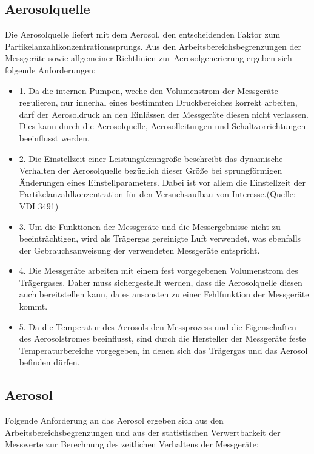 \subsection{Aerosolquelle}
Die Aerosolquelle liefert mit dem Aerosol, den entscheidenden Faktor zum Partikelanzahlkonzentrationssprungs. Aus den Arbeitsbereichsbegrenzungen der Messger\"{a}te sowie allgemeiner Richtlinien zur Aerosolgenerierung ergeben sich folgende Anforderungen:

\begin{itemize}
\item 1. Da die internen Pumpen, weche den Volumenstrom der Messger\"{a}te regulieren, nur innerhal eines bestimmten Druckbereiches korrekt arbeiten, darf der Aerosoldruck an den Einl\"{a}ssen der Messger\"{a}te diesen nicht verlassen. Dies kann durch die Aerosolquelle, Aerosolleitungen und Schaltvorrichtungen beeinflusst werden. 

\item 2. Die Einstellzeit einer Leistungskenngr\"{o}{\ss}e beschreibt das dynamische Verhalten der Aerosolquelle bez\"{u}glich dieser Gr\"{o}{\ss}e bei sprungf\"{o}rmigen \"{A}nderungen eines Einstellparameters. Dabei ist vor allem die Einstellzeit der Partikelanzahlkonzentration für den Versuchsaufbau von Interesse.(Quelle: VDI 3491)

\item 3. Um die Funktionen der Messger\"{a}te und die Messergebnisse nicht zu beeintr\"{a}chtigen, wird als Tr\"{a}gergas gereinigte Luft verwendet, was ebenfalls der Gebrauchsanweisung der verwendeten Messger\"{a}te entspricht. 

\item 4. Die Messger\"{a}te arbeiten mit einem fest vorgegebenen Volumenstrom des Tr\"{a}gergases. Daher muss sichergestellt werden, dass die Aerosolquelle diesen auch bereitstellen kann, da es ansonsten zu einer Fehlfunktion der Messger\"{a}te kommt. 

\item 5. Da die Temperatur des Aerosols den Messprozess und die Eigenschaften des Aerosolstromes beeinflusst, sind durch die Hersteller der Messger\"{a}te feste Temperaturbereiche vorgegeben, in denen sich das Tr\"{a}gergas und das Aerosol befinden d\"{u}rfen.  
\end{itemize}

\subsection{Aerosol}
Folgende Anforderung an das Aerosol ergeben sich aus den Arbeitsbereichsbegrenzungen und aus der statistischen Verwertbarkeit der Messwerte zur Berechnung des zeitlichen Verhaltens der Messger\"{a}te:


